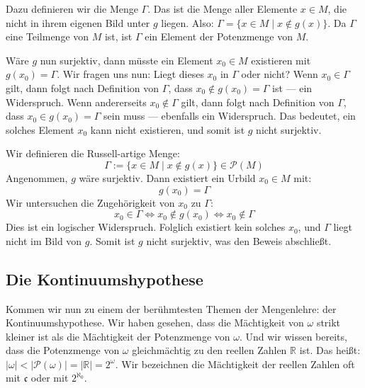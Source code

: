 \begin{spoken-clean}[01:02:29 - 01:03:23]
Dazu definieren wir die Menge $\Gamma$. Das ist die Menge aller Elemente $x \in M$, die nicht in ihrem eigenen Bild unter $g$ liegen. Also: $\Gamma = \{ x \in M \mid x \notin g(x) \}$. Da $\Gamma$ eine Teilmenge von $M$ ist, ist $\Gamma$ ein Element der Potenzmenge von $M$.

Wäre $g$ nun surjektiv, dann müsste ein Element $x_0 \in M$ existieren mit $g(x_0) = \Gamma$. Wir fragen uns nun: Liegt dieses $x_0$ in $\Gamma$ oder nicht? Wenn $x_0 \in \Gamma$ gilt, dann folgt nach Definition von $\Gamma$, dass $x_0 \notin g(x_0) = \Gamma$ ist --- ein Widerspruch. Wenn andererseits $x_0 \notin \Gamma$ gilt, dann folgt nach Definition von $\Gamma$, dass $x_0 \in g(x_0) = \Gamma$ sein muss --- ebenfalls ein Widerspruch. Das bedeutet, ein solches Element $x_0$ kann nicht existieren, und somit ist $g$ nicht surjektiv.
\end{spoken-clean}

\begin{math-stroke}
Wir definieren die Russell-artige Menge:
\[
\Gamma := \{ x \in M \mid x \notin g(x) \} \in \mathcal{P}(M)
\]
Angenommen, $g$ wäre surjektiv. Dann existiert ein Urbild $x_0 \in M$ mit:
\[
g(x_0) = \Gamma
\]
Wir untersuchen die Zugehörigkeit von $x_0$ zu $\Gamma$:
\[
x_0 \in \Gamma \iff x_0 \notin g(x_0) \iff x_0 \notin \Gamma
\]
Dies ist ein logischer Widerspruch. Folglich existiert kein solches $x_0$, und $\Gamma$ liegt nicht im Bild von $g$. Somit ist $g$ nicht surjektiv, was den Beweis abschließt.
\end{math-stroke}

\subsection{Die Kontinuumshypothese}

\begin{spoken-clean}[01:03:23 - 01:05:20]
Kommen wir nun zu einem der berühmtesten Themen der Mengenlehre: der Kontinuumshypothese. Wir haben gesehen, dass die Mächtigkeit von $\omega$ strikt kleiner ist als die Mächtigkeit der Potenzmenge von $\omega$. Und wir wissen bereits, dass die Potenzmenge von $\omega$ gleichmächtig zu den reellen Zahlen $\mathbb{R}$ ist. Das heißt: $|\omega| < |\mathcal{P}(\omega)| = |\mathbb{R}| = 2^\omega$. Wir bezeichnen die Mächtigkeit der reellen Zahlen oft mit $\mathfrak{c}$ oder mit $2^{\aleph_0}$.
\end{spoken-clean}

